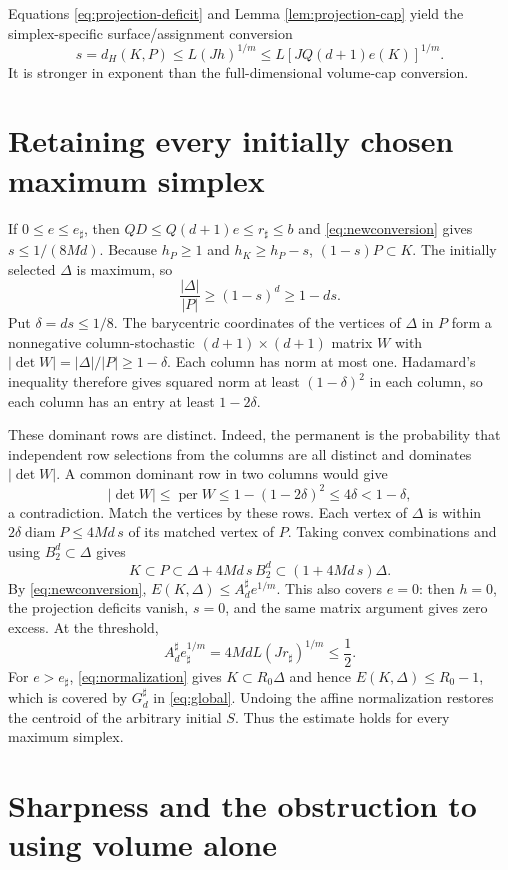 \documentclass[11pt]{article}
\newcommand{\BB}{B_2^d}
\begin{document}
Equations \eqref{eq:projection-deficit} and Lemma
\ref{lem:projection-cap} yield the simplex-specific surface/assignment
conversion
\begin{equation}\label{eq:newconversion}
 s=d_H(K,P)\le L(Jh)^{1/m}
 \le L[JQ(d+1)e(K)]^{1/m}.
\end{equation}
It is stronger in exponent than the full-dimensional volume-cap conversion.

\section{Retaining every initially chosen maximum simplex}

If $0\le e\le e_\sharp$, then
$QD\le Q(d+1)e\le r_\sharp\le b$ and
\eqref{eq:newconversion} gives $s\le1/(8Md)$.
Because $h_P\ge1$ and $h_K\ge h_P-s$,
$(1-s)P\subset K$.
The initially selected $\Delta$ is maximum, so
\[
 \frac{|\Delta|}{|P|}\ge(1-s)^d\ge1-ds.
\]
Put $\delta=ds\le1/8$.
The barycentric coordinates of the vertices of $\Delta$ in $P$ form
a nonnegative column-stochastic $(d+1)\times(d+1)$ matrix $W$ with
$|\det W|=|\Delta|/|P|\ge1-\delta$.
Each column has norm at most one.
Hadamard's inequality therefore gives squared norm at least
$(1-\delta)^2$ in each column, so each column has an entry at least
$1-2\delta$.

These dominant rows are distinct.
Indeed, the permanent is the probability that independent row selections
from the columns are all distinct and dominates $|\det W|$.
A common dominant row in two columns would give
\[
 |\det W|\le\operatorname{per}W
 \le1-(1-2\delta)^2\le4\delta<1-\delta,
\]
a contradiction.
Match the vertices by these rows.
Each vertex of $\Delta$ is within
$2\delta\operatorname{diam}P\le4Md\,s$ of its matched vertex of $P$.
Taking convex combinations and using $\BB\subset\Delta$ gives
\[
 K\subset P\subset\Delta+4Md\,s\,\BB
          \subset(1+4Md\,s)\Delta.
\]
By \eqref{eq:newconversion},
$E(K,\Delta)\le A_d^\sharp e^{1/m}$.
This also covers $e=0$: then $h=0$, the projection deficits vanish,
$s=0$, and the same matrix argument gives zero excess.
At the threshold,
\[
 A_d^\sharp e_\sharp^{1/m}
   =4MdL(Jr_\sharp)^{1/m}\le\frac12.
\]
For $e>e_\sharp$, \eqref{eq:normalization} gives
$K\subset R_0\Delta$ and hence $E(K,\Delta)\le R_0-1$,
which is covered by $G_d^\sharp$ in \eqref{eq:global}.
Undoing the affine normalization restores the centroid of the arbitrary
initial $S$. Thus the estimate holds for every maximum simplex.

\section{Sharpness and the obstruction to using volume alone}
\end{document}
